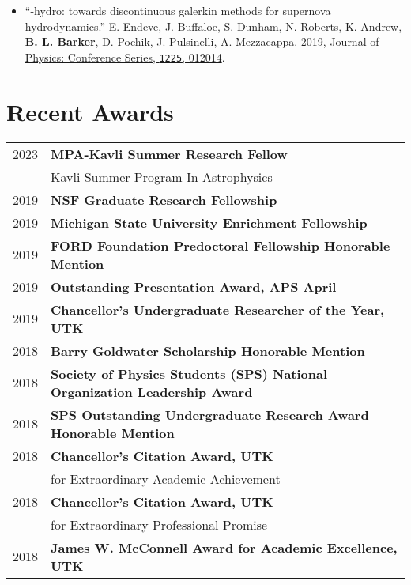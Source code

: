 \documentclass[letterpaper]{deedy-resume} %
\begin{document}
\begin{minipage}[t]{0.63\textwidth}
\begin{itemize}
  \item ``\thornado-hydro: towards discontinuous galerkin methods for supernova hydrodynamics.'' E. Endeve, J. Buffaloe, S. Dunham, N. Roberts, K. Andrew, \textbf{B. L. Barker}, D. Pochik, J. Pulsinelli, A. Mezzacappa. 2019, \href{https://doi.org/10.1088/1742-6596/1225/1/012014}{Journal of Physics: Conference Series, \texttt{1225}, 012014}.
   

\end{itemize}

\section{Recent Awards}
\begin{tabular}{rl}
  2023 & \textbf{MPA-Kavli Summer Research Fellow} \\
    & Kavli Summer Program In Astrophysics \\
  2019 & \textbf{NSF Graduate Research Fellowship} \\
  2019 & \textbf{Michigan State University Enrichment Fellowship} \\
  2019 & \textbf{FORD Foundation Predoctoral Fellowship Honorable Mention} \\
  2019 & \textbf{Outstanding Presentation Award, APS April} \\
  2019 & \textbf{Chancellor's Undergraduate Researcher of the Year, UTK} \\
  2018 & \textbf{Barry Goldwater Scholarship Honorable Mention} \\
  2018 & \textbf{Society of Physics Students (SPS) National Organization Leadership Award} \\
  2018 & \textbf{SPS Outstanding Undergraduate Research Award Honorable Mention}\\
  2018 & \textbf{Chancellor’s Citation Award, UTK}\\ & for Extraordinary Academic Achievement \\
  2018 & \textbf{Chancellor’s Citation Award, UTK}\\ &  for Extraordinary Professional Promise \\
  2018 & \textbf{James W. McConnell Award for Academic Excellence, UTK} \\

\end{tabular}
\end{minipage}
\end{document}
